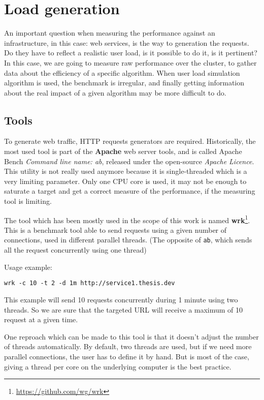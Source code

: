 \section{Load generation}

An important question when measuring the performance against an infrastructure,
in this case: web services, is the way to generation the requests. Do they
have to reflect a realistic user load, is it possible to do it, is it pertinent?
In this case, we are going to measure raw performance over the cluster, to gather
data about the efficiency of a specific algorithm. When user load simulation algorithm
is used, the benchmark is irregular, and finally getting information about
the real impact of a given algorithm may be more difficult to do.

\subsection{Tools}

To generate web traffic, HTTP requests generators are required. Historically,
the most used tool is part of the \textbf{Apache} web server tools, and is
called Apache Bench \textit{Command line name: ab}, released under the open-source
\textit{Apache Licence}. This utility is not really
used anymore because it is single-threaded which is a very limiting parameter.
Only one CPU core is used, it may not be enough to saturate a target and get a
correct measure of the performance, if the measuring tool is limiting.

The tool which has been mostly used in the scope of this work is named
\textbf{wrk}\footnote{\url{https://github.com/wg/wrk}}. This is a benchmark
tool able to send requests using a given number of connections, used in
different parallel threads. (The opposite of \texttt{ab}, which sends all
the request concurrently using one thread)

Usage example:

\vspace{1em}
\begin{lstlisting}
wrk -c 10 -t 2 -d 1m http://service1.thesis.dev
\end{lstlisting}

This example will send 10 requests concurrently during 1 minute using two threads.
So we are sure that the targeted URL will receive a maximum of 10 request at a
given time.

One reproach which can be made to this tool is that it doesn't adjust the
number of threads automatically. By default, two threads are used, but if we
need more parallel connections, the user has to define it by hand. But is most
of the case, giving a thread per core on the underlying computer is the
best practice.

